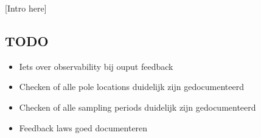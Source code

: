 [Intro here]

\subsection*{TODO}
\begin{itemize}
    \item Iets over observability bij ouput feedback
    \item Checken of alle pole locations duidelijk zijn gedocumenteerd
    \item Checken of alle sampling periods duidelijk zijn gedocumenteerd
    \item Feedback laws goed documenteren
\end{itemize}